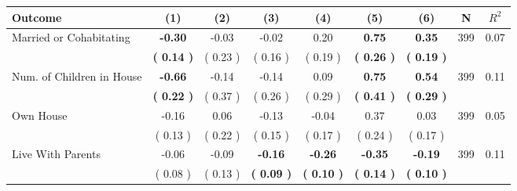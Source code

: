 \begin{tabular}{lcccccccc}
\toprule
 \textbf{Outcome} & \textbf{(1)} & \textbf{(2)} & \textbf{(3)} & \textbf{(4)} & \textbf{(5)} & \textbf{(6)} & \textbf{N} & \textbf{$ R^2$} \\
\midrule
Married or Cohabitating & \textbf{    -0.30} &     -0.03 &     -0.02 &      0.20 & \textbf{     0.75} & \textbf{     0.35} & 399 &       0.07 \\ 
 & \textbf{(     0.14 )} & (     0.23 ) & (     0.16 ) & (     0.19 ) & \textbf{(     0.26 )} & \textbf{(     0.19 )} & \\
Num. of Children in House & \textbf{    -0.66} &     -0.14 &     -0.14 &      0.09 & \textbf{     0.75} & \textbf{     0.54} & 399 &       0.11 \\ 
 & \textbf{(     0.22 )} & (     0.37 ) & (     0.26 ) & (     0.29 ) & \textbf{(     0.41 )} & \textbf{(     0.29 )} & \\
Own House &     -0.16 &      0.06 &     -0.13 &     -0.04 &      0.37 &      0.03 & 399 &       0.05 \\ 
 & (     0.13 ) & (     0.22 ) & (     0.15 ) & (     0.17 ) & (     0.24 ) & (     0.17 ) & \\
Live With Parents &     -0.06 &     -0.09 & \textbf{    -0.16} & \textbf{    -0.26} & \textbf{    -0.35} & \textbf{    -0.19} & 399 &       0.11 \\ 
 & (     0.08 ) & (     0.13 ) & \textbf{(     0.09 )} & \textbf{(     0.10 )} & \textbf{(     0.14 )} & \textbf{(     0.10 )} & \\
\bottomrule
\end{tabular}
